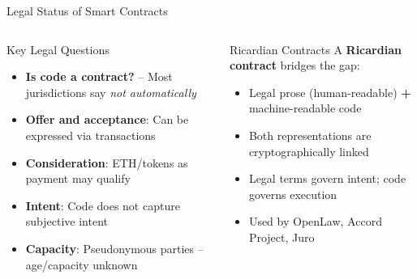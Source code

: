 \documentclass[8pt,aspectratio=169]{beamer}
\begin{document}
\begin{frame}{Legal Status of Smart Contracts}
\begin{columns}[T]
\begin{block}{Key Legal Questions}
\footnotesize
\begin{itemize}
  \item \textbf{Is code a contract?} -- Most jurisdictions say \emph{not automatically}
  \item \textbf{Offer and acceptance}: Can be expressed via transactions
  \item \textbf{Consideration}: ETH/tokens as payment may qualify
  \item \textbf{Intent}: Code does not capture subjective intent
  \item \textbf{Capacity}: Pseudonymous parties -- age/capacity unknown
\end{itemize}
\end{block}
\vspace{2mm}
\begin{block}{Ricardian Contracts}
\footnotesize
A \textbf{Ricardian contract} bridges the gap:
\begin{itemize}
  \item Legal prose (human-readable) \textbf{+} machine-readable code
  \item Both representations are cryptographically linked
  \item Legal terms govern intent; code governs execution
  \item Used by OpenLaw, Accord Project, Juro
\end{itemize}
\end{block}


\end{columns}
\end{frame}
\end{document}
